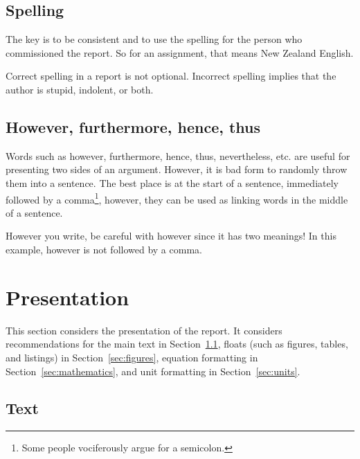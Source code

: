 \documentclass[a4paper,12pt]{article}
\newcommand{\refsec}[1]{\mbox{Section~\ref{sec:#1}}}
\newcounter{foo}
\newcounter{bar}
\begin{document}
\subsection{Spelling}
\label{sec:spelling}

\begin{list}{W-}{}
\setcounter{foo}{\value{bar}}
\item The key is to be consistent and to use the spelling for the person who
commissioned the report.  So for an assignment, that means New Zealand
English.


\item Correct spelling in a report is not optional.  Incorrect spelling
implies that the author is stupid, indolent, or both. 

\setcounter{bar}{\value{foo}}
\end{list}


\subsection{However, furthermore, hence, thus}
\label{sec:however}

Words such as however, furthermore, hence, thus, nevertheless,
etc. are useful for presenting two sides of an argument.  However, it
is bad form to randomly throw them into a sentence.  The best place is
at the start of a sentence, immediately followed by a
comma\footnote{Some people vociferously argue for a semicolon.},
however, they can be used as linking words in the middle of a
sentence.

However you write, be careful with however since it has two meanings!
In this example, however is not followed by a comma.


\section{Presentation}
\label{sec:presentation}


This section considers the presentation of the report.  It considers
recommendations for the main text in \refsec{text}, floats (such as
figures, tables, and listings) in \refsec{figures}, equation
formatting in \refsec{mathematics}, and unit formatting in
\refsec{units}.


\subsection{Text}
\label{sec:text}
\end{document}
